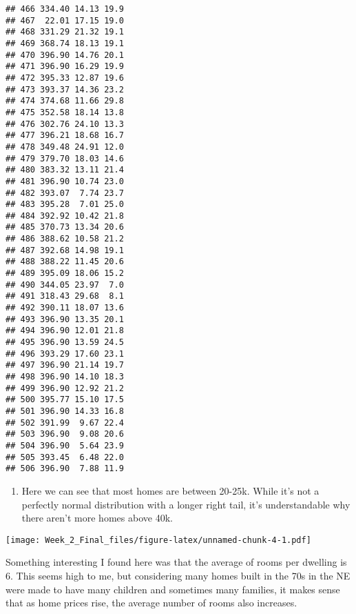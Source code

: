 \documentclass[]{article}
\newenvironment{Shaded}{\begin{snugshade}}{\end{snugshade}}
\newcommand{\KeywordTok}[1]{\textcolor[rgb]{0.13,0.29,0.53}{\textbf{#1}}}
\newcommand{\OperatorTok}[1]{\textcolor[rgb]{0.81,0.36,0.00}{\textbf{#1}}}
\newcommand{\NormalTok}[1]{#1}
\providecommand{\tightlist}{%
  \setlength{\itemsep}{0pt}\setlength{\parskip}{0pt}}
\begin{document}
\begin{verbatim}
## 466 334.40 14.13 19.9
## 467  22.01 17.15 19.0
## 468 331.29 21.32 19.1
## 469 368.74 18.13 19.1
## 470 396.90 14.76 20.1
## 471 396.90 16.29 19.9
## 472 395.33 12.87 19.6
## 473 393.37 14.36 23.2
## 474 374.68 11.66 29.8
## 475 352.58 18.14 13.8
## 476 302.76 24.10 13.3
## 477 396.21 18.68 16.7
## 478 349.48 24.91 12.0
## 479 379.70 18.03 14.6
## 480 383.32 13.11 21.4
## 481 396.90 10.74 23.0
## 482 393.07  7.74 23.7
## 483 395.28  7.01 25.0
## 484 392.92 10.42 21.8
## 485 370.73 13.34 20.6
## 486 388.62 10.58 21.2
## 487 392.68 14.98 19.1
## 488 388.22 11.45 20.6
## 489 395.09 18.06 15.2
## 490 344.05 23.97  7.0
## 491 318.43 29.68  8.1
## 492 390.11 18.07 13.6
## 493 396.90 13.35 20.1
## 494 396.90 12.01 21.8
## 495 396.90 13.59 24.5
## 496 393.29 17.60 23.1
## 497 396.90 21.14 19.7
## 498 396.90 14.10 18.3
## 499 396.90 12.92 21.2
## 500 395.77 15.10 17.5
## 501 396.90 14.33 16.8
## 502 391.99  9.67 22.4
## 503 396.90  9.08 20.6
## 504 396.90  5.64 23.9
## 505 393.45  6.48 22.0
## 506 396.90  7.88 11.9
\end{verbatim}

\begin{enumerate}
\def\labelenumi{\arabic{enumi})}
\setcounter{enumi}{1}
\tightlist
\item
  Here we can see that most homes are between 20-25k. While it's not a
  perfectly normal distribution with a longer right tail, it's
  understandable why there aren't more homes above 40k.
\end{enumerate}

\begin{Shaded}
\end{Shaded}

\texttt{[image: Week\_2\_Final\_files/figure-latex/unnamed-chunk-4-1.pdf]}

Something interesting I found here was that the average of rooms per
dwelling is 6. This seems high to me, but considering many homes built
in the 70s in the NE were made to have many children and sometimes many
families, it makes sense that as home prices rise, the average number of
rooms also increases.

\begin{Shaded}
\end{Shaded}
\end{document}
